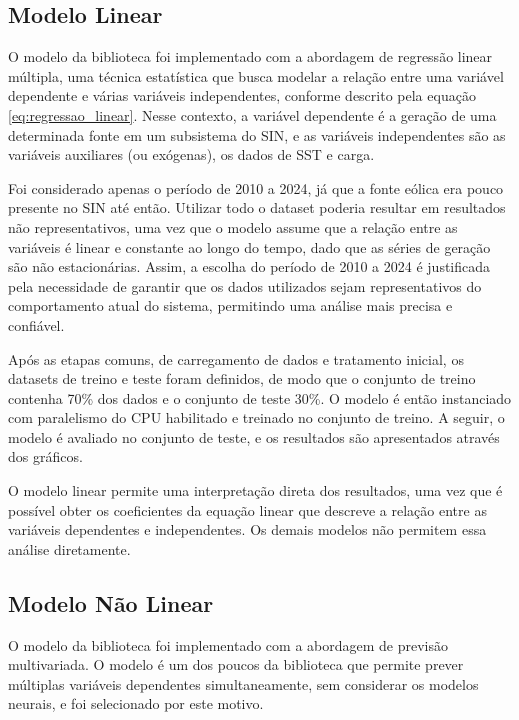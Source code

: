 \subsection{Modelo Linear} %
O modelo  da biblioteca  foi implementado com a abordagem de regressão linear múltipla, 
uma técnica estatística que busca modelar a relação entre uma variável dependente e várias variáveis independentes, conforme descrito pela 
equação \ref{eq:regressao_linear}. Nesse contexto, a variável dependente é a geração de uma determinada fonte em um subsistema do 
SIN, e as variáveis independentes são as variáveis auxiliares (ou exógenas), os dados de SST e carga.

Foi considerado apenas o período de 2010 a 2024, já que a fonte eólica era pouco presente no SIN até então. Utilizar todo
o dataset poderia resultar em resultados não representativos, uma vez que o modelo assume que a relação entre as variáveis 
é linear e constante ao longo do tempo, dado que as séries de geração são não estacionárias. Assim, a escolha do período de 2010 
a 2024 é justificada pela necessidade de garantir que os dados utilizados sejam representativos do comportamento atual do 
sistema, permitindo uma análise mais precisa e confiável.

Após as etapas comuns, de carregamento de dados e tratamento inicial, os datasets de treino e teste foram definidos, de modo que
o conjunto de treino contenha 70\% dos dados e o conjunto de teste 30\%. O modelo é então instanciado com paralelismo do
CPU habilitado e treinado no conjunto de treino. A seguir, o modelo é avaliado no conjunto de teste, e os resultados são
apresentados através dos gráficos.

O modelo linear permite uma interpretação direta dos resultados, uma vez que é possível obter os coeficientes da equação
linear que descreve a relação entre as variáveis dependentes e independentes. Os demais modelos não permitem essa análise diretamente.

\subsection{Modelo Não Linear} %
O modelo  da biblioteca  foi implementado com a abordagem de previsão multivariada.
O modelo é um dos poucos da biblioteca que permite prever múltiplas variáveis dependentes simultaneamente, sem considerar os modelos
neurais, e foi selecionado por este motivo.

